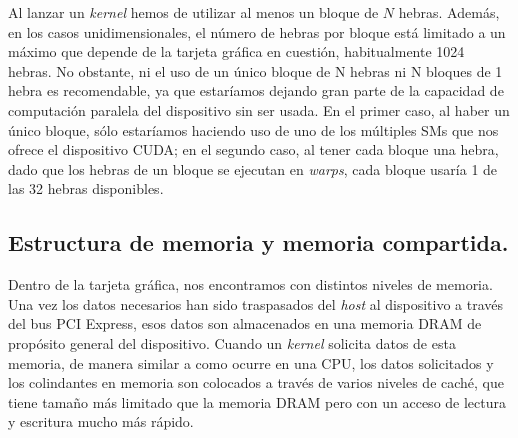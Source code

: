 Al lanzar un \textit{kernel} hemos de utilizar al menos un bloque de $N$ hebras. Además, en los casos unidimensionales, el número de hebras por bloque está limitado a un máximo que depende de la tarjeta gráfica en cuestión, habitualmente 1024 hebras. No obstante, ni el uso de un único bloque de N hebras ni N bloques de 1 hebra es recomendable, ya que estaríamos dejando gran parte de la capacidad de computación paralela del dispositivo \cuda sin ser usada. En el primer caso, al haber un único bloque, sólo estaríamos haciendo uso de uno de los múltiples SMs que nos ofrece el dispositivo CUDA; en el segundo caso, al tener cada bloque una hebra, dado que los hebras de un bloque se ejecutan en \textit{warps}, cada bloque usaría 1 de las 32 hebras disponibles. 


\subsection{Estructura de memoria y memoria compartida.}
Dentro de la tarjeta gráfica, nos encontramos con distintos niveles de memoria. Una vez los datos necesarios han sido traspasados del \textit{host} al dispositivo a través del bus PCI Express, esos datos son almacenados en una memoria DRAM de propósito general del dispositivo. Cuando un \textit{kernel} solicita datos de esta memoria, de manera similar a como ocurre en una CPU, los datos solicitados y los colindantes en memoria son colocados a través de varios niveles de caché, que tiene tamaño más limitado que la memoria DRAM pero con un acceso de lectura y escritura mucho más rápido.\\

